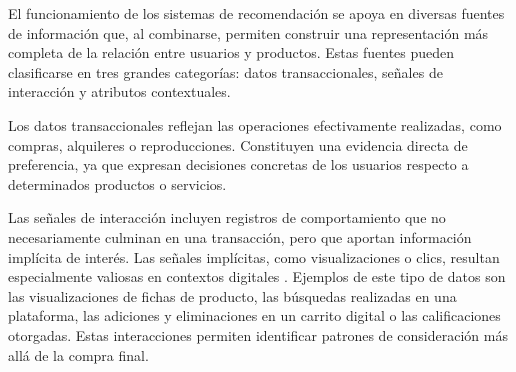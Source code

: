 



El funcionamiento de los sistemas de recomendación se apoya en diversas fuentes de información \cite{BOOK:Ricci2015,ARTICLE:Adomavicius2005} que, al combinarse, permiten construir una representación más completa de la relación entre usuarios y productos. Estas fuentes pueden clasificarse en tres grandes categorías: datos transaccionales, señales de interacción y atributos contextuales.

Los datos transaccionales reflejan las operaciones efectivamente realizadas, como compras, alquileres o reproducciones. Constituyen una evidencia directa de preferencia, ya que expresan decisiones concretas de los usuarios respecto a determinados productos o servicios.

Las señales de interacción incluyen registros de comportamiento que no necesariamente culminan en una transacción, pero que aportan información implícita de interés. Las señales implícitas, como visualizaciones o clics, resultan especialmente valiosas en contextos digitales \cite{ARTICLE:Hu2008,ARTICLE:Covington2016}. Ejemplos de este tipo de datos son las visualizaciones de fichas de producto, las búsquedas realizadas en una plataforma, las adiciones y eliminaciones en un carrito digital o las calificaciones otorgadas. Estas interacciones permiten identificar patrones de consideración más allá de la compra final.

